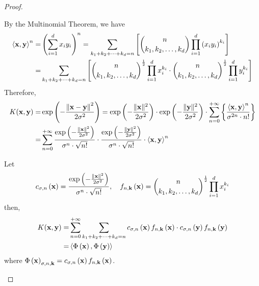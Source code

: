 \begin{proof}
\begin{enumerate}
		      By the Multinomial Theorem, we have
		      \begin{equation*}
			      \begin{aligned}
				      \left\langle\mathbf{x},\mathbf{y}\right\rangle^{n}= & \left(\sum_{i=1}^{d}x_{i}y_{i}\right)^{n}=\sum_{k_{1}+k_{2}+\cdots+k_{d}=n}\left[\binom{n}{k_{1},k_{2},\ldots,k_{d}}\prod_{i=1}^{d}\left(x_{i}y_{i}\right)^{k_{i}}\right]                                     \\
				      =                                             & \sum_{k_{1}+k_{2}+\cdots+k_{d}=n}\left[\binom{n}{k_{1},k_{2},\ldots,k_{d}}^{\frac{1}{2}}\prod_{i=1}^{d}x_{i}^{k_{i}}\cdot\binom{n}{k_{1},k_{2},\ldots,k_{d}}^{\frac{1}{2}}\prod_{i=1}^{d}y_{i}^{k_{i}}\right] \\
			      \end{aligned}
		      \end{equation*}
		      Therefore,
		      \begin{equation*}
			      \begin{aligned}
				      K(\mathbf{x},\mathbf{y})= & \exp\left(-\frac{\left\|\mathbf{x}-\mathbf{y}\right\|^{2}}{2\sigma^{2}}\right)=\exp\left(-\frac{\|\mathbf{x}\|^{2}}{2\sigma^{2}}\right)\cdot\exp\left(-\frac{\|\mathbf{y}\|^{2}}{2\sigma^{2}}\right)\cdot\sum_{n=0}^{+\infty}\left\{\frac{\left\langle\mathbf{x},\mathbf{y}\right\rangle^{n}}{\sigma^{2n}\cdot n!}\right\} \\
				      =                   & \sum_{n=0}^{+\infty}\frac{\exp\left(-\frac{\|\mathbf{x}\|^{2}}{2\sigma^{2}}\right)}{\sigma^{n}\cdot\sqrt{n!}}\cdot\frac{\exp\left(-\frac{\|\mathbf{y}\|^{2}}{2\sigma^{2}}\right)}{\sigma^{n}\cdot\sqrt{n!}}\cdot\left\langle\mathbf{x},\mathbf{y}\right\rangle^{n}
			      \end{aligned}
		      \end{equation*}

		      Let
		      \begin{equation*}
			      c_{\sigma,n}\left(\mathbf{x}\right)=\frac{\exp\left(-\frac{\|\mathbf{x}\|^{2}}{2\sigma^{2}}\right)}{\sigma^{n}\cdot\sqrt{n!}},\quad f_{n,\mathbf{k}}\left(\mathbf{x}\right)=\binom{n}{k_{1},k_{2},\ldots,k_{d}}^{\frac{1}{2}}\prod_{i=1}^{d}x_{i}^{k_{i}}
		      \end{equation*}
		      then,
		      \begin{equation*}
			      \begin{aligned}
				      K(\mathbf{x},\mathbf{y})= & \sum_{n=0}^{+\infty}\sum_{k_{1}+k_{2}+\cdots+k_{d}=n}c_{\sigma,n}\left(\mathbf{x}\right)f_{n,\mathbf{k}}\left(\mathbf{x}\right)\cdot c_{\sigma,n}\left(\mathbf{y}\right)f_{n,\mathbf{k}}\left(\mathbf{y}\right) \\
				      =                   & \left\langle\Phi\left(\mathbf{x}\right),\Phi\left(\mathbf{y}\right)\right\rangle                                                                                                                          \\
			      \end{aligned}
		      \end{equation*}
		      where \(\Phi\left(\mathbf{x}\right)_{\sigma,n,\mathbf{k}}=c_{\sigma,n}\left(\mathbf{x}\right)f_{n,\mathbf{k}}\left(\mathbf{x}\right)\).


\end{enumerate}
\end{proof}
